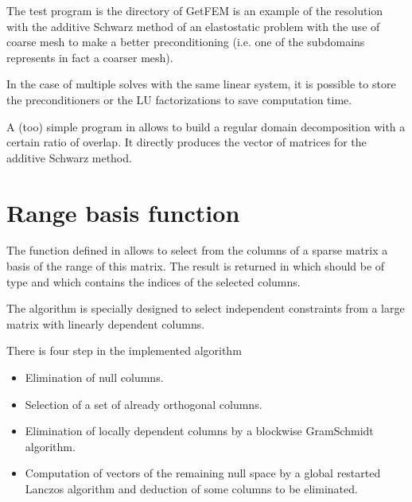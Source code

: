 \documentclass[a4paper,11pt,english]{sphinxmanual}
\begin{document}
\sphinxAtStartPar
The test program  is the directory  of GetFEM is an example of the resolution with the additive Schwarz method of an elastostatic problem with the use of coarse mesh to make a better preconditioning (i.e. one of the sub\sphinxhyphen{}domains represents in fact a coarser mesh).

\sphinxAtStartPar
In the case of multiple solves with the same linear system, it is possible to store the preconditioners or the LU factorizations to save computation time.

\sphinxAtStartPar
A (too) simple program in  allows to build a regular domain decomposition with a certain ratio of overlap. It directly produces the vector of matrices  for the additive Schwarz method.


\section{Range basis function}
\label{\detokenize{gmm/iter:range-basis-function}}
\sphinxAtStartPar
The function  defined in  allows to select from the columns of a sparse matrix  a basis of the range of this matrix. The result is returned in  which should be of type  and which contains the indices of the selected columns.

\sphinxAtStartPar
The algorithm is specially designed to select independent constraints from a large matrix with linearly dependent columns.

\sphinxAtStartPar
There is four step in the implemented algorithm
\begin{itemize}
\item {} 
\sphinxAtStartPar
Elimination of null columns.

\item {} 
\sphinxAtStartPar
Selection of a set of already orthogonal columns.

\item {} 
\sphinxAtStartPar
Elimination of locally dependent columns by a blockwise Gram\sphinxhyphen{}Schmidt algorithm.

\item {} 
\sphinxAtStartPar
Computation of vectors of the remaining null space by a global restarted Lanczos algorithm and deduction of some columns to be eliminated.

\end{itemize}
\end{document}
